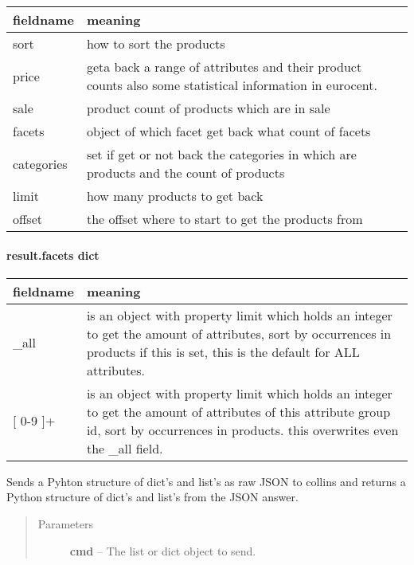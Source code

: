 \documentclass[letterpaper,10pt,english]{sphinxmanual}
\begin{document}
\begin{fulllineitems}
\begin{fulllineitems}
\begin{tabulary}{\linewidth}{|L|L|}
\hline
\textsf{\relax 
fieldname
} & \textsf{\relax 
meaning
}\\
\hline
sort
 & 
how to sort the products
\\

price
 & 
geta back a range of attributes and their product counts
also some statistical information in eurocent.
\\

sale
 & 
product count of products which are in sale
\\

facets
 & 
object of which facet get back what count of facets
\\

categories
 & 
set if get or not back the categories in which are products
and the count of products
\\

limit
 & 
how many products to get back
\\

offset
 & 
the offset where to start to get the products from
\\
\hline\end{tabulary}

\paragraph{result.facets dict}

\begin{tabulary}{\linewidth}{|L|L|}
\hline
\textsf{\relax 
fieldname
} & \textsf{\relax 
meaning
}\\
\hline
\_all
 & 
is an object with property limit which holds an integer
to get the amount of attributes, sort by occurrences in
products if this is set, this is the default for
ALL attributes.
\\

{[} 0-9 {]}+
 & 
is an object with property limit which holds an integer to
get the amount of attributes of this attribute group id,
sort by occurrences in products. this overwrites even the
\_all field.
\\
\hline\end{tabulary}


\end{fulllineitems}


\begin{fulllineitems}
\label{collins:collins.Collins.send}
Sends a Pyhton structure of dict's and list's as raw JSON to collins and
returns a Python structure of dict's and list's from the JSON answer.
\begin{quote}\begin{description}
\item[{Parameters}] \leavevmode
\textbf{cmd} -- The list or dict object to send.


\end{description}
\end{quote}
\end{fulllineitems}
\end{fulllineitems}
\end{document}

